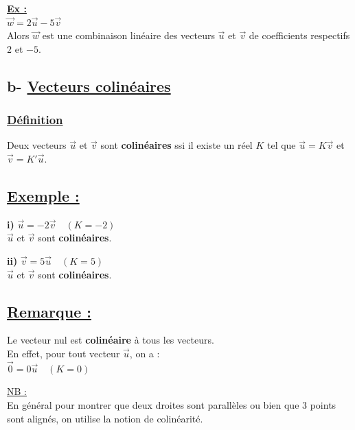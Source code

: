 \documentclass{article}
\begin{document}
\vspace{1em}

\noindent \underline{\textbf{Ex :}} \\
$\vec{w} = 2\vec{u} - 5\vec{v}$ \\
Alors $\vec{w}$ est une combinaison linéaire des vecteurs $\vec{u}$ et $\vec{v}$ de coefficients respectifs $2$ et $-5$.

\subsection*{b- \underline{Vecteurs colinéaires}}

\subsubsection*{\underline{\color{red}Définition}}

\noindent Deux vecteurs $\vec{u}$ et $\vec{v}$ sont \textbf{colinéaires} ssi il existe un réel $K$ tel que $\vec{u} = K\vec{v}$ et $\vec{v} = K'\vec{u}$.

\vspace{1em}

\subsection*{\underline{\color{red}Exemple :}}

\noindent \textbf{i)} $\vec{u} = -2\vec{v} \quad (K = -2)$ \\
$\vec{u}$ et $\vec{v}$ sont \textbf{colinéaires}.

\vspace{1em}

\noindent \textbf{ii)} $\vec{v} = 5\vec{u} \quad (K = 5)$ \\
$\vec{u}$ et $\vec{v}$ sont \textbf{colinéaires}.

\vspace{1.5em}

\subsection*{\underline{\color{red}Remarque :}}

\noindent Le vecteur nul est \textbf{colinéaire} à tous les vecteurs. \\
En effet, pour tout vecteur $\vec{u}$, on a : \\
$\vec{0} = 0\vec{u} \quad (K = 0)$

\noindent \underline{NB :} \\
En général pour montrer que deux droites sont parallèles ou bien que 3 points sont alignés, on utilise la notion de colinéarité.
\end{document}
